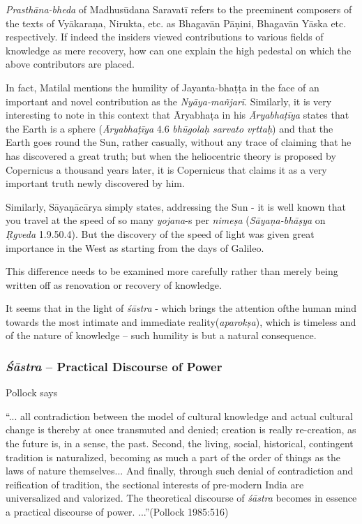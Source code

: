 {\sl Prasthāna-bheda} of Madhusūdana Saravatī refers to the preeminent composers of the texts of Vyākaraṇa, Nirukta, etc. as Bhagavān Pāṇini, Bhagavān Yāska etc. respectively. If indeed the insiders viewed contributions to various ﬁelds of knowledge as mere recovery, how can one explain the high pedestal on which the above contributors are placed. 

In fact, Matilal mentions the humility of Jayanta-bhaṭṭa in the face of an important and novel contribution as the {\sl Nyāya-mañjarī}. Similarly, it is very interesting to note in this context that Āryabhaṭa in his  {\sl Āryabhaṭīya} states that the Earth is a sphere ({\sl Āryabhaṭīya} 4.6 {\sl bhūgolaḥ sarvato vṛttaḥ}) and that the Earth goes round the Sun, rather casually, without any trace of claiming that he has discovered a great truth; but when the heliocentric theory is proposed by Copernicus a thousand years later, it is Copernicus that claims it as a very important truth newly discovered by him. 

Similarly, Sāyaṇācārya simply states, addressing the Sun - it is well known that you travel at the speed of so many {\sl yojana}-s per {\sl nimeṣa} ({\sl Sāyaṇa-bhāṣya} on {\sl Ṛgveda} 1.9.50.4). But the discovery of  the speed of light was given great importance in the West as starting from the days of Galileo. 

This difference needs to be examined more carefully rather than merely being written off as renovation or recovery of knowledge. 

It seems that in the light of {\sl śāstra} - which brings the attention of\break the human mind towards the most intimate and immediate reality\break ({\sl aparokṣa}), which is timeless and of the nature of knowledge -- such humility is but a natural consequence.\\[-25pt]

\subsubsection{{{\sl\bfseries Śāstra}\relax} -- Practical Discourse of Power}\label{art12-sec3.8.3}

Pollock  says
\begin{myquote}
``... all contradiction between the model of cultural knowledge and actual cultural change is thereby at once transmuted and denied; creation is really re-creation, as the  future is, in a sense, the past. Second, the living, social, historical, contingent tradition is naturalized, becoming as much a part of the order of things as the laws of nature  themselves... And ﬁnally, through such denial of contradiction and reiﬁcation of tradition, the sectional interests of pre-modern India are universalized and valorized. The theoretical discourse of {\sl śāstra} becomes in essence a practical discourse of power. ...''\hfill (Pollock 1985:516)
\end{myquote}

